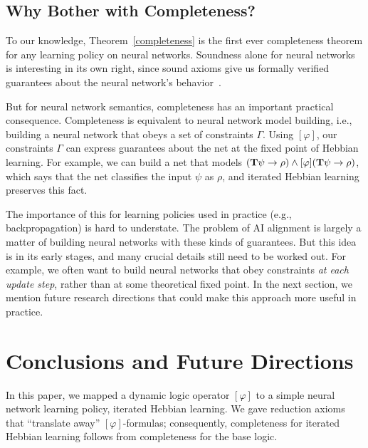 \documentclass[letterpaper]{article}
\theoremstyle{definition}
\newcommand{\Typ}[1]{\textrm{\textup{\textbf{T}}} #1}
\newcommand{\Hebbop}[1]{[#1]}
\begin{document}
\subsection{Why Bother with Completeness?}

To our knowledge, Theorem~\ref{completeness} is the first ever completeness theorem for any learning policy on neural networks.  Soundness alone for neural networks is interesting in its own right, since sound axioms give us formally verified guarantees about the neural network's behavior~\cite{albarghouthi2021introduction, garcez2001symbolic}.

But for neural network semantics, completeness has an important practical consequence.  Completeness is equivalent to neural network model building, i.e., building a neural network that obeys a set of constraints $\Gamma$.  Using $\Hebbop{\varphi}$, our constraints $\Gamma$ can express guarantees about the net at the fixed point of Hebbian learning.  For example, we can build a net that models $(\Typ \psi \to \rho) \land \Hebbop{\varphi} (\Typ \psi \to \rho)$, which says that the net classifies the input $\psi$ as $\rho$, and iterated Hebbian learning preserves this fact.

The importance of this for learning policies used in practice (e.g., backpropagation) is hard to understate.  The problem of AI alignment is largely a matter of building neural networks with these kinds of guarantees.  But this idea is in its early stages, and many crucial details still need to be worked out.  For example, we often want to build neural networks that obey constraints \emph{at each update step}, rather than at some theoretical fixed point.  In the next section, we mention future research directions that could make this approach more useful in practice.

\section{Conclusions and Future Directions}

In this paper, we mapped a dynamic logic operator $\Hebbop{\varphi}$ to a simple neural network learning policy, iterated Hebbian learning.  We gave reduction axioms that ``translate away'' $\Hebbop{\varphi}$-formulas; consequently, completeness for iterated Hebbian learning follows from completeness for the base logic.
\end{document}
